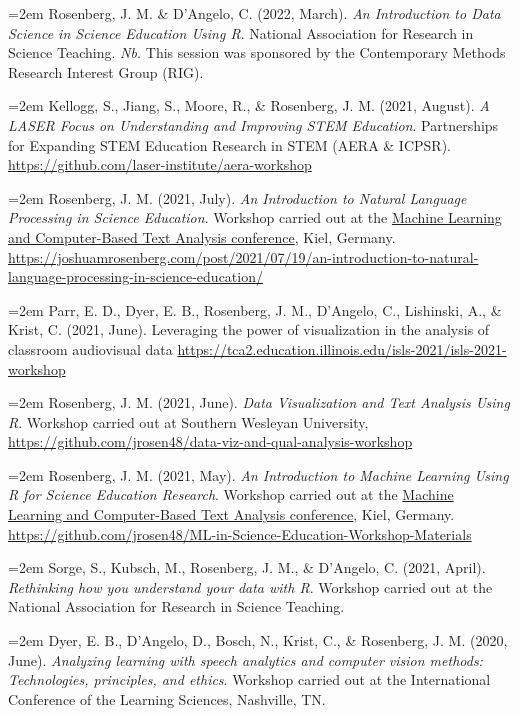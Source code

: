 \documentclass[
  14,
]{article}
\begin{document}
\hangindent=2em Rosenberg, J. M. \& D'Angelo, C. (2022, March). \emph{An
Introduction to Data Science in Science Education Using R}. National
Association for Research in Science Teaching. \emph{Nb.} This session
was sponsored by the Contemporary Methods Research Interest Group (RIG).

\hangindent=2em Kellogg, S., Jiang, S., Moore, R., \& Rosenberg, J. M.
(2021, August). \emph{A LASER Focus on Understanding and Improving STEM
Education}. Partnerships for Expanding STEM Education Research in STEM
(AERA \& ICPSR). \url{https://github.com/laser-institute/aera-workshop}

\hangindent=2em Rosenberg, J. M. (2021, July). \emph{An Introduction to
Natural Language Processing in Science Education}. Workshop carried out
at the
\href{https://www.ipn.uni-kiel.de/en/the-ipn/news/gdcp-focus-conference-machine-learning-and-computer-based-text-analysis-may-6th-7th-2021-register-now}{Machine
Learning and Computer-Based Text Analysis conference}, Kiel, Germany.
\url{https://joshuamrosenberg.com/post/2021/07/19/an-introduction-to-natural-language-processing-in-science-education/}

\hangindent=2em Parr, E. D., Dyer, E. B., Rosenberg, J. M., D'Angelo,
C., Lishinski, A., \& Krist, C. (2021, June). Leveraging the power of
visualization in the analysis of classroom audiovisual data
\url{https://tca2.education.illinois.edu/isls-2021/isls-2021-workshop}

\hangindent=2em Rosenberg, J. M. (2021, June). \emph{Data Visualization
and Text Analysis Using R}. Workshop carried out at Southern Wesleyan
University,
\url{https://github.com/jrosen48/data-viz-and-qual-analysis-workshop}

\hangindent=2em Rosenberg, J. M. (2021, May). \emph{An Introduction to
Machine Learning Using R for Science Education Research}. Workshop
carried out at the
\href{https://www.ipn.uni-kiel.de/en/the-ipn/news/gdcp-focus-conference-machine-learning-and-computer-based-text-analysis-may-6th-7th-2021-register-now}{Machine
Learning and Computer-Based Text Analysis conference}, Kiel, Germany.
\url{https://github.com/jrosen48/ML-in-Science-Education-Workshop-Materials}

\hangindent=2em Sorge, S., Kubsch, M., Rosenberg, J. M., \& D'Angelo, C.
(2021, April). \emph{Rethinking how you understand your data with R}.
Workshop carried out at the National Association for Research in Science
Teaching.

\hangindent=2em Dyer, E. B., D'Angelo, D., Bosch, N., Krist, C., \&
Rosenberg, J. M. (2020, June). \emph{Analyzing learning with speech
analytics and computer vision methods: Technologies, principles, and
ethics}. Workshop carried out at the International Conference of the
Learning Sciences, Nashville, TN.
\end{document}
